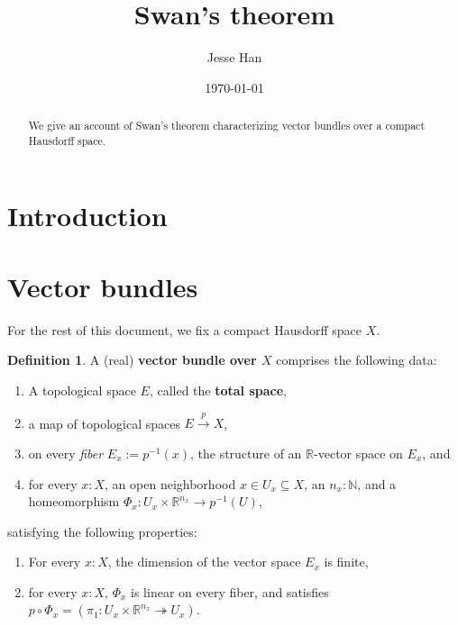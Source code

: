 \documentclass[11pt]{article}
\newcommand{\R}{\mathbb{R}}
\theoremstyle{plain}
\theoremstyle{definition}
\newtheorem{definition}{Definition}[section]
\newcommand{\N}{\mathbb{N}}
\begin{document}
\title{Swan's theorem}
\author{Jesse Han}
\date{\today}

\maketitle

\begin{abstract}
We give an account of Swan's theorem characterizing vector bundles over a compact Hausdorff space.
\end{abstract}

\section*{Introduction}

\section{Vector bundles}
For the rest of this document, we fix a compact Hausdorff space \(X\).
\begin{definition}

\label{def-vector-bundle}
 A (real) \textbf{vector bundle over \(X\)} comprises the following data:
  \begin{enumerate}[label={(\roman*)}]
  \item A topological space \(E\), called the \textbf{total space},
  \item a map of topological spaces \(E \overset{p}{\to} X\),
  \item on every \emph{fiber} \(E_x := p^{-1}(x)\), the structure of an \(\R\)-vector space on \(E_x\), and
  \item for every \(x : X\), an open neighborhood \(x \in U_x \subseteq X\), an \(n_x : \N\), and a homeomorphism \(\Phi_x : U_x \times \R^{n_x} \to p^{-1}(U)\),
  \end{enumerate}

  satisfying the following properties:
\begin{enumerate}[label={(\alph*)}]
  \item For every \(x : X\), the dimension of the vector space \(E_x\) is finite,
  \item \label{local-triviality} for every \(x : X\), \(\Phi_x\) is linear on every fiber, and satisfies \(p \circ \Phi_x = (\pi_1 : U_x \times \R^{n_x} \twoheadrightarrow U_x)\).
\end{enumerate}  
\end{definition}
\end{document}
